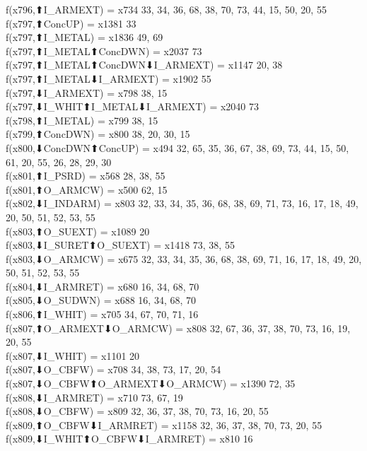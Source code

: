 f(x796,⬆I_ARMEXT) = x734 {33, 34, 36, 68, 38, 70, 73, 44, 15, 50, 20, 55} \\
f(x797,⬆ConcUP) = x1381 {33} \\
f(x797,⬆I_METAL) = x1836 {49, 69} \\
f(x797,⬆I_METAL⬆ConcDWN) = x2037 {73} \\
f(x797,⬆I_METAL⬆ConcDWN⬇I_ARMEXT) = x1147 {20, 38} \\
f(x797,⬆I_METAL⬇I_ARMEXT) = x1902 {55} \\
f(x797,⬇I_ARMEXT) = x798 {38, 15} \\
f(x797,⬇I_WHIT⬆I_METAL⬇I_ARMEXT) = x2040 {73} \\
f(x798,⬆I_METAL) = x799 {38, 15} \\
f(x799,⬆ConcDWN) = x800 {38, 20, 30, 15} \\
f(x800,⬇ConcDWN⬆ConcUP) = x494 {32, 65, 35, 36, 67, 38, 69, 73, 44, 15, 50, 61, 20, 55, 26, 28, 29, 30} \\
f(x801,⬆I_PSRD) = x568 {28, 38, 55} \\
f(x801,⬆O_ARMCW) = x500 {62, 15} \\
f(x802,⬇I_INDARM) = x803 {32, 33, 34, 35, 36, 68, 38, 69, 71, 73, 16, 17, 18, 49, 20, 50, 51, 52, 53, 55} \\
f(x803,⬆O_SUEXT) = x1089 {20} \\
f(x803,⬇I_SURET⬆O_SUEXT) = x1418 {73, 38, 55} \\
f(x803,⬇O_ARMCW) = x675 {32, 33, 34, 35, 36, 68, 38, 69, 71, 16, 17, 18, 49, 20, 50, 51, 52, 53, 55} \\
f(x804,⬇I_ARMRET) = x680 {16, 34, 68, 70} \\
f(x805,⬇O_SUDWN) = x688 {16, 34, 68, 70} \\
f(x806,⬆I_WHIT) = x705 {34, 67, 70, 71, 16} \\
f(x807,⬆O_ARMEXT⬇O_ARMCW) = x808 {32, 67, 36, 37, 38, 70, 73, 16, 19, 20, 55} \\
f(x807,⬇I_WHIT) = x1101 {20} \\
f(x807,⬇O_CBFW) = x708 {34, 38, 73, 17, 20, 54} \\
f(x807,⬇O_CBFW⬆O_ARMEXT⬇O_ARMCW) = x1390 {72, 35} \\
f(x808,⬇I_ARMRET) = x710 {73, 67, 19} \\
f(x808,⬇O_CBFW) = x809 {32, 36, 37, 38, 70, 73, 16, 20, 55} \\
f(x809,⬆O_CBFW⬇I_ARMRET) = x1158 {32, 36, 37, 38, 70, 73, 20, 55} \\
f(x809,⬇I_WHIT⬆O_CBFW⬇I_ARMRET) = x810 {16} \\
